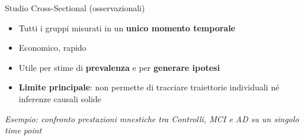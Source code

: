 \documentclass[
  ignorenonframetext,
]{beamer}
\providecommand{\tightlist}{%
  \setlength{\itemsep}{0pt}\setlength{\parskip}{0pt}}
\begin{document}
\begin{frame}{Studio Cross-Sectional (osservazionali)}
\label{studio-cross-sectional-osservazionali}
\begin{center}
\end{center}
\vspace{-0.3em}

\small

\begin{itemize}
\tightlist
\item
  Tutti i gruppi misurati in un \textbf{unico momento temporale}
\item
  Economico, rapido
\item
  Utile per stime di \textbf{prevalenza} e per \textbf{generare ipotesi}
\item
  \textbf{Limite principale}: non permette di tracciare traiettorie
  individuali né inferenze causali solide
\end{itemize}

\emph{Esempio: confronto prestazioni mnestiche tra Controlli, MCI e AD
su un singolo time point}
\end{frame}
\end{document}
